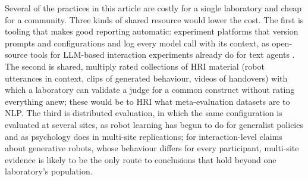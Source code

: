 Several of the practices in this article are costly for a single laboratory
and cheap for a community. Three kinds of shared resource would lower the
cost. The first is tooling that makes good reporting automatic: experiment
platforms that version prompts and configurations and log every model call
with its context, as open-source tools for LLM-based interaction experiments
already do for text agents \cite{laban2024lexi}. The second is shared,
multiply rated collections of HRI material (robot utterances in context,
clips of generated behaviour, videos of handovers) with which a laboratory
can validate a judge for a common construct without rating everything anew;
these would be to HRI what meta-evaluation datasets are to NLP. The third is
distributed evaluation, in which the same configuration is evaluated at
several sites, as robot learning has begun to do for generalist policies
\cite{atreya2025roboarena} and as psychology does in multi-site
replications; for interaction-level claims about generative robots, whose
behaviour differs for every participant, multi-site evidence is likely to be
the only route to conclusions that hold beyond one laboratory's population.
